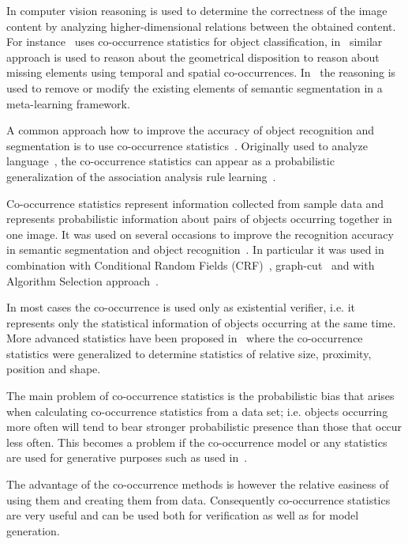 \documentclass[conference]{IEEEtran}
\begin{document}
In computer vision reasoning is used to determine the correctness of the image content by analyzing higher-dimensional relations between the obtained content. For instance~\cite{galleguillos:08} uses co-occurrence statistics for object classification, in~\cite{fablet:03} similar approach is used to reason about the geometrical disposition to reason about missing elements using temporal and spatial co-occurrences. In~\cite{lukac:13d,lukac:15} the reasoning is used to remove or modify the existing elements of  semantic segmentation in a meta-learning framework. 


A common approach how to improve the accuracy of object recognition and segmentation is to use co-occurrence statistics~\cite{ladicky:10}. Originally used to analyze language~\cite{kroeger:05}, the co-occurrence statistics can appear as a probabilistic generalization of the association analysis rule learning~\cite{piatetsky:91,agrawal:93}.

Co-occurrence statistics represent information collected from sample data and represents probabilistic information about pairs of objects occurring together in one image. It was used on several occasions to improve the recognition accuracy in semantic segmentation and object recognition~\cite{ladicky:10,lukac:13d}. In particular it was used in combination with Conditional Random Fields (CRF)~\cite{ladicky:10}, graph-cut~\cite{ladicky:13} and with Algorithm Selection approach~\cite{lukac:15,lukac:16}. 

In most cases the co-occurrence is used only as existential verifier, i.e. it represents only the statistical information of objects occurring at the same time. More advanced statistics have been proposed in~\cite{lukac:15} where the co-occurrence statistics were generalized to determine statistics of relative size, proximity, position and shape. 

The main problem of co-occurrence statistics is the probabilistic bias that arises when calculating co-occurrence statistics from a data set; i.e. objects occurring more often will tend to bear stronger probabilistic presence than those that occur less often. This becomes a problem if the co-occurrence model or any statistics are used for generative purposes such as used in~\cite{lukac:15}. 

The advantage of the co-occurrence methods is however the relative easiness of using them and creating them from data. Consequently co-occurrence statistics are very useful and can be used both for verification as well as for model generation.
\end{document}
